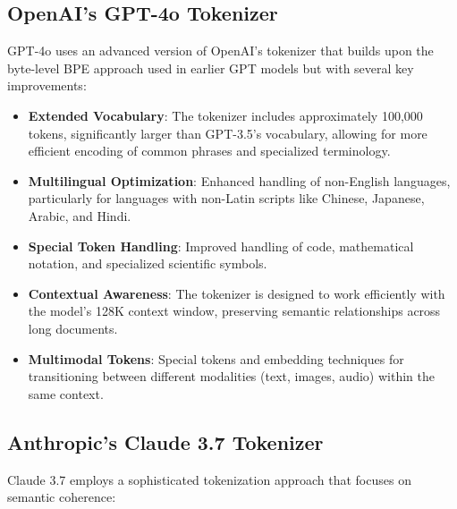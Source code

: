 \documentclass{article}
\begin{document}
\subsection{OpenAI's GPT-4o Tokenizer}
GPT-4o uses an advanced version of OpenAI's tokenizer that builds upon the byte-level BPE approach used in earlier GPT models but with several key improvements:

\begin{itemize}
\item \textbf{Extended Vocabulary}: The tokenizer includes approximately 100,000 tokens, significantly larger than GPT-3.5's vocabulary, allowing for more efficient encoding of common phrases and specialized terminology.

\item \textbf{Multilingual Optimization}: Enhanced handling of non-English languages, particularly for languages with non-Latin scripts like Chinese, Japanese, Arabic, and Hindi.

\item \textbf{Special Token Handling}: Improved handling of code, mathematical notation, and specialized scientific symbols.

\item \textbf{Contextual Awareness}: The tokenizer is designed to work efficiently with the model's 128K context window, preserving semantic relationships across long documents.

\item \textbf{Multimodal Tokens}: Special tokens and embedding techniques for transitioning between different modalities (text, images, audio) within the same context.
\end{itemize}

\subsection{Anthropic's Claude 3.7 Tokenizer}
Claude 3.7 employs a sophisticated tokenization approach that focuses on semantic coherence:
\end{document}
